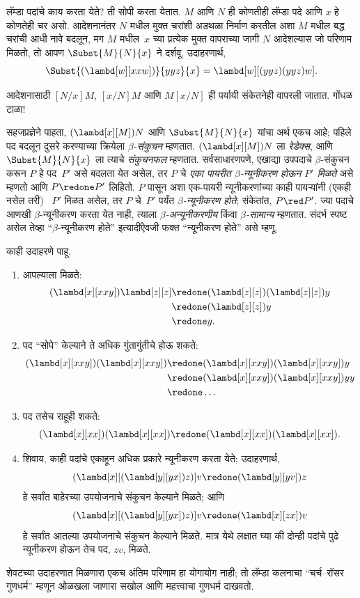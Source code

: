 \documentclass[../../../include/open-logic-section]{subfiles}
\begin{document}

लॅम्डा पदांचे काय करता येते? ती सोपी करता येतात. $M$ आणि $N$ ही
कोणतीही लॅम्डा पदे आणि $x$ हे कोणतेही चर असो. आदेशनानंतर $N$ मधील
मुक्त चरांशी अडथळा निर्माण करतील अशा $M$ मधील बद्ध चरांची आधी
नावे बदलून, मग $M$ मधील~$x$ च्या प्रत्येक मुक्त वापराच्या जागी $N$ आदेशल्यास जो परिणाम
मिळतो, तो आपण $\Subst{M}{N}{x}$ ने दर्शवू. उदाहरणार्थ,
\[
\Subst{(\lambd[w][xxw])}{yyz}{x} = \lambd[w][(yyz)(yyz)w].
\]

\begin{digress}
आदेशनासाठी $[N/x]M$, $[x/N]M$ आणि $M[x/N]$ ही पर्यायी
संकेतनेही वापरली जातात. गोंधळ टाळा!
\end{digress}

सहजप्रज्ञेने पाहता, $(\lambd[x][M])N$ आणि $\Subst{M}{N}{x}$
यांचा अर्थ एकच आहे; पहिले पद बदलून दुसरे करण्याच्या क्रियेला
\emph{$\beta$-संकुचन} म्हणतात. $(\lambd[x][M])N$ ला
\emph{रेडेक्स}, आणि $\Subst{M}{N}{x}$ ला त्याचे
\emph{संकुचनफल} म्हणतात. सर्वसाधारणपणे, एखाद्या उपपदाचे
$\beta$-संकुचन करून $P$ हे पद~$P'$ असे बदलता येत असेल, तर
$P$ चे \emph{एका पायरीत $\beta$-न्यूनीकरण होऊन $P'$ मिळते}
असे म्हणतो आणि $P \redone P'$ लिहितो. $P$ पासून अशा
एक-पायरी न्यूनीकरणांच्या काही पायऱ्यांनी (एकही नसेल तरी)
~$P'$ मिळत असेल, तर $P$ चे~$P'$ पर्यंत
\emph{$\beta$-न्यूनीकरण होते}; संकेतांत, $P \red P'$.
ज्या पदाचे आणखी $\beta$-न्यूनीकरण करता येत नाही, त्याला
\emph{$\beta$-अन्यूनीकरणीय} किंवा \emph{$\beta$-सामान्य}
म्हणतात. संदर्भ स्पष्ट असेल तेव्हा “$\beta$-न्यूनीकरण होते”
इत्यादींऐवजी फक्त “न्यूनीकरण होते” असे म्हणू.

काही उदाहरणे पाहू.
\begin{enumerate}
\item आपल्याला मिळते:
\begin{align*}
(\lambd[x][xxy]) \lambd[z][z] & \redone (\lambd[z][z])(\lambd[z][z]) y \\
& \redone (\lambd[z][z]) y \\
& \redone y.
\end{align*}
\item पद “सोपे” केल्याने ते अधिक गुंतागुंतीचे होऊ शकते:
\begin{align*}
(\lambd[x][xxy])(\lambd[x][xxy]) & \redone (\lambd[x][xxy])(\lambd[x][xxy])y \\
& \redone (\lambd[x][xxy])(\lambd[x][xxy])yy \\
& \redone \dots
\end{align*}
\item पद तसेच राहूही शकते:
\[
(\lambd[x][xx])(\lambd[x][xx]) \redone (\lambd[x][xx])(\lambd[x][xx]).
\]
\item शिवाय, काही पदांचे एकाहून अधिक प्रकारे न्यूनीकरण करता येते;
  उदाहरणार्थ,
\[
(\lambd[x][(\lambd[y][yx]) z)] v \redone (\lambd[y][yv]) z
\]
हे सर्वांत बाहेरच्या उपयोजनाचे संकुचन केल्याने मिळते; आणि
\[
(\lambd[x][(\lambd[y][yx]) z)] v \redone (\lambd[x][zx]) v
\]
हे सर्वांत आतल्या उपयोजनाचे संकुचन केल्याने मिळते. मात्र येथे
लक्षात घ्या की दोन्ही पदांचे पुढे न्यूनीकरण होऊन तेच पद, $zv$, मिळते.
\end{enumerate}

शेवटच्या उदाहरणात मिळणारा एकच अंतिम परिणाम हा योगायोग नाही;
तो लॅम्डा कलनाचा “चर्च--रॉसर गुणधर्म” म्हणून ओळखला जाणारा
सखोल आणि महत्त्वाचा गुणधर्म दाखवतो.
\end{document}
